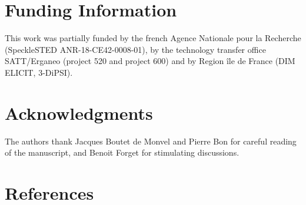 \documentclass[10pt,twocolumn,twoside,letterpaper]{article}
\begin{document}
\section*{Funding Information}
This work was partially funded by the french Agence Nationale pour la Recherche (SpeckleSTED ANR-18-CE42-0008-01), by the technology transfer office SATT/Erganeo (project 520 and project 600) and by Region île de France (DIM ELICIT, 3-DiPSI).
\section*{Acknowledgments}
The authors thank Jacques Boutet de Monvel and Pierre Bon for careful reading of the manuscript, and Benoit Forget for stimulating discussions.

\section*{References}


%
%
%
\end{document}
